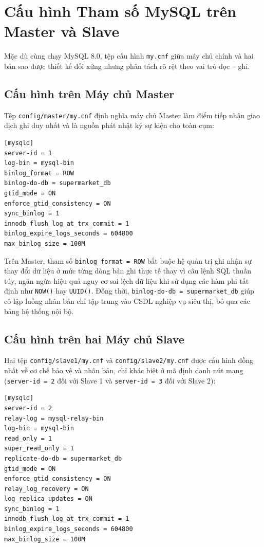 \documentclass[12pt,a4paper]{report}
\begin{document}
\section{Cấu hình Tham số MySQL trên Master và Slave}
Mặc dù cùng chạy MySQL 8.0, tệp cấu hình \texttt{my.cnf} giữa máy chủ chính và hai bản sao được thiết kế đối xứng nhưng phân tách rõ rệt theo vai trò đọc -- ghi.

\subsection{Cấu hình trên Máy chủ Master}
Tệp \texttt{config/master/my.cnf} định nghĩa máy chủ Master làm điểm tiếp nhận giao dịch ghi duy nhất và là nguồn phát nhật ký sự kiện cho toàn cụm:

\begin{lstlisting}[caption={Cấu hình tham số my.cnf trên máy chủ Master}]
[mysqld]
server-id = 1
log-bin = mysql-bin
binlog_format = ROW
binlog-do-db = supermarket_db
gtid_mode = ON
enforce_gtid_consistency = ON
sync_binlog = 1
innodb_flush_log_at_trx_commit = 1
binlog_expire_logs_seconds = 604800
max_binlog_size = 100M
\end{lstlisting}

Trên Master, tham số \texttt{binlog\_format = ROW} bắt buộc hệ quản trị ghi nhận sự thay đổi dữ liệu ở mức từng dòng bản ghi thực tế thay vì câu lệnh SQL thuần túy, ngăn ngừa hiệu quả nguy cơ sai lệch dữ liệu khi sử dụng các hàm phi tất định như \texttt{NOW()} hay \texttt{UUID()}. Đồng thời, \texttt{binlog-do-db = supermarket\_db} giúp cô lập luồng nhân bản chỉ tập trung vào CSDL nghiệp vụ siêu thị, bỏ qua các bảng hệ thống nội bộ.

\subsection{Cấu hình trên hai Máy chủ Slave}
Hai tệp \texttt{config/slave1/my.cnf} và \texttt{config/slave2/my.cnf} được cấu hình đồng nhất về cơ chế bảo vệ và nhân bản, chỉ khác biệt ở mã định danh nút mạng (\texttt{server-id = 2} đối với Slave 1 và \texttt{server-id = 3} đối với Slave 2):

\begin{lstlisting}[caption={Cấu hình tham số my.cnf trên máy chủ Slave 1 (Slave 2 đặt server-id = 3)}]
[mysqld]
server-id = 2
relay-log = mysql-relay-bin
log-bin = mysql-bin
read_only = 1
super_read_only = 1
replicate-do-db = supermarket_db
gtid_mode = ON
enforce_gtid_consistency = ON
relay_log_recovery = ON
log_replica_updates = ON
sync_binlog = 1
innodb_flush_log_at_trx_commit = 1
binlog_expire_logs_seconds = 604800
max_binlog_size = 100M
\end{lstlisting}
\end{document}
